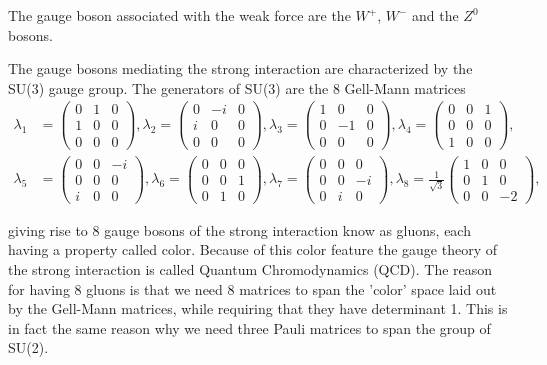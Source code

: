 The gauge boson associated with the weak force are the $W^+$, $W^-$ and the $Z^0$ bosons.

The gauge bosons mediating the strong interaction are characterized by the SU(3) gauge group. The generators of SU(3) are the 8 Gell-Mann matrices
\begin{align} \label{eq:gellmannmatrices}
	\lambda_1 &= \begin{pmatrix} 0 & 1 & 0 \\ 1 & 0 & 0 \\ 0 & 0 & 0 \end{pmatrix},
	\lambda_2 = \begin{pmatrix} 0 & -i & 0 \\ i & 0 & 0 \\ 0 & 0 & 0 \end{pmatrix},
	\lambda_3 = \begin{pmatrix} 1 & 0 & 0 \\ 0 & -1 & 0 \\ 0 & 0 & 0 \end{pmatrix},
	\lambda_4 = \begin{pmatrix} 0 & 0 & 1 \\ 0 & 0 & 0 \\ 1 & 0 & 0 \end{pmatrix}, \nonumber \\
	\lambda_5 &= \begin{pmatrix} 0 & 0 & -i \\ 0 & 0 & 0 \\ i & 0 & 0 \end{pmatrix},
	\lambda_6 = \begin{pmatrix} 0 & 0 & 0 \\ 0 & 0 & 1 \\ 0 & 1 & 0 \end{pmatrix},
	\lambda_7 = \begin{pmatrix} 0 & 0 & 0 \\ 0 & 0 & -i \\ 0 & i & 0 \end{pmatrix},
	\lambda_8 = \frac{1}{\sqrt{3}} \begin{pmatrix} 1 & 0 & 0 \\ 0 & 1 & 0 \\ 0 & 0 & -2 \end{pmatrix},
\end{align}

giving rise to 8 gauge bosons of the strong interaction know as gluons, each having a property called color. Because of this color feature the gauge theory of the strong interaction is called Quantum Chromodynamics (QCD). The reason for having 8 gluons is that we need 8 matrices to span the 'color' space laid out by the Gell-Mann matrices, while requiring that they have determinant 1. This is in fact the same reason why we need three Pauli matrices to span the group of SU(2).

